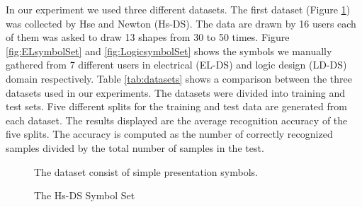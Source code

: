 \documentclass[preprint,1p,times,review]{elsarticle}
\begin{document}
In our experiment we used three different datasets. The first dataset (Figure \ref{fig:HsSet}) was collected by Hse and Newton\cite{HeloiseBeautification} (Hs-DS). The data are drawn by 16 users each of them was asked to draw 13 shapes from 30 to 50 times. Figure \ref{fig:ELsymbolSet} and \ref{fig:LogicsymbolSet} shows the symbols we manually gathered from 7 different users in electrical (EL-DS) and logic design (LD-DS) domain respectively.  Table \ref{tab:datasets} shows a comparison between the three datasets used in our experiments. The datasets were divided into training and test sets. Five different splits for the training and test data are generated from each dataset. The results displayed are the average recognition accuracy of the five splits. The accuracy is computed as the number of correctly recognized samples divided by the total number of samples in the test.


\begin{figure}
\centering

		\caption{The Hs-DS Symbol Set} The dataset consist of simple presentation symbols.
		\label{fig:HsSet}
\end{figure}
\begin{table}
\begin{center}
\caption[Datasets Comparisons]{Table compares between datasets used in experiments in terms of number of samples, number of samples per category, etc...}
\label{tab:datasets}

\end{center}
\end{table}
\end{document}
